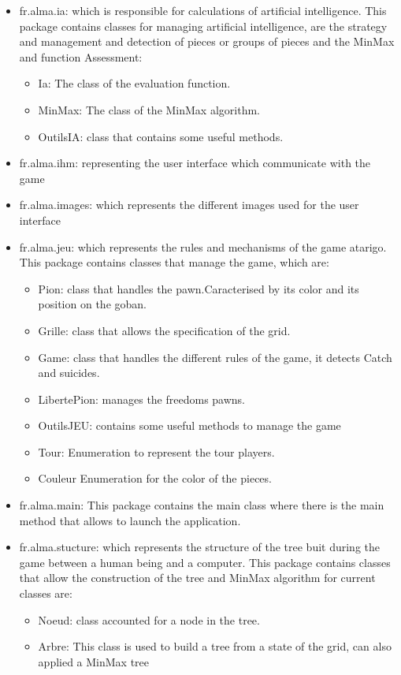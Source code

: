 \documentclass{report}
\begin{document}
\begin{itemize}
\item { {\large fr.alma.ia}:  which is responsible for calculations of artificial intelligence.
This package contains classes for managing artificial intelligence, are the strategy and
management and detection of pieces or groups of pieces and the MinMax and function
Assessment:
\begin {itemize}
   \item Ia: The class of the evaluation function.
   \item MinMax: The class of the MinMax algorithm.
   \item OutilsIA: class that contains some useful methods.
\end{itemize} 
}
\item { {\large fr.alma.ihm}:  representing the user interface which communicate with the game}\\
\item { {\large fr.alma.images}:  which represents the different images used for the user interface}\\
\item { {\large fr.alma.jeu}:  which represents the rules and mechanisms of the game atarigo.
  This package contains classes that manage the game, which are:
\begin {itemize}
   \item Pion: class that handles the pawn.Caracterised by its color and its position on the goban.
   \item Grille: class that allows the specification of the grid.
   \item Game: class that handles the different rules of the game, it detects
       Catch and suicides.
   \item LibertePion: manages the freedoms pawns.
   \item OutilsJEU: contains some useful methods to manage the game
  \item Tour: Enumeration to represent the tour players.
   \item Couleur Enumeration for the color of the pieces.
\end{itemize} 
}

\item { {\large fr.alma.main}:  This package contains the main class where there is the main method that allows to launch the application.}\\
\item { {\large fr.alma.stucture}:  which represents the structure of the tree buit during the game between a human being and a computer.
This package contains classes that allow the construction of the tree and
MinMax algorithm for current classes are:
\begin {itemize}
     \item Noeud: class accounted for a node in the tree.
     \item Arbre: This class is used to build a tree from a state of the grid,
         can also applied a MinMax tree
\end{itemize} 
}
\end{itemize}
\end{document}
